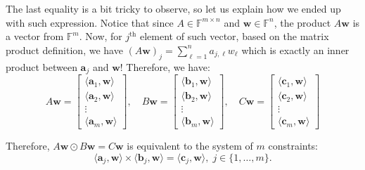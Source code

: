 \documentclass[../lecture-notes.tex]{subfiles}
\begin{document}
The last equality is a bit tricky to observe, so let us explain how we ended up with such expression. Notice that since $A \in \mathbb{F}^{m \times n}$ and $\mathbf{w} \in \mathbb{F}^n$, the product $A\mathbf{w}$ is a vector from $\mathbb{F}^m$. Now, for $j^{\text{th}}$ element of such vector, based on the matrix product definition, we have $(A\mathbf{w})_j = \sum_{\ell=1}^na_{j,\ell}w_{\ell}$ which is exactly an inner product between $\mathbf{a}_j$ and $\mathbf{w}$! Therefore, we have:
\begin{equation*}
    A\mathbf{w} = \begin{bmatrix}
        \langle \mathbf{a}_1, \mathbf{w}\rangle \\
        \langle \mathbf{a}_2, \mathbf{w}\rangle \\
        \vdots \\
        \langle \mathbf{a}_m, \mathbf{w}\rangle 
    \end{bmatrix}, \quad
    B\mathbf{w} = \begin{bmatrix}
        \langle \mathbf{b}_1, \mathbf{w}\rangle \\
        \langle \mathbf{b}_2, \mathbf{w}\rangle \\
        \vdots \\
        \langle \mathbf{b}_m, \mathbf{w}\rangle 
    \end{bmatrix}, \quad
    C\mathbf{w} = \begin{bmatrix}
        \langle \mathbf{c}_1, \mathbf{w}\rangle \\
        \langle \mathbf{c}_2, \mathbf{w}\rangle \\
        \vdots \\
        \langle \mathbf{c}_m, \mathbf{w}\rangle 
    \end{bmatrix}
\end{equation*}

Therefore, $A\mathbf{w} \odot B\mathbf{w} = C\mathbf{w}$ is equivalent to the system of $m$ constraints:
\begin{equation*}
    \langle \mathbf{a}_j, \mathbf{w}\rangle \times \langle \mathbf{b}_j, \mathbf{w} \rangle = \langle \mathbf{c}_j, \mathbf{w} \rangle, \; j \in \{1,\dots,m\}.
\end{equation*}
\end{document}
